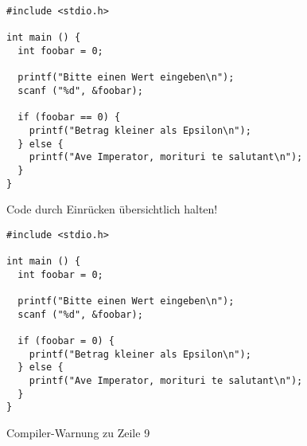 
\begin{frame}[fragile]
%
\begin{codebox}
\begin{verbatim}
#include <stdio.h>

int main () {
  int foobar = 0;
  
  printf("Bitte einen Wert eingeben\n");
  scanf ("%d", &foobar);
  
  if (foobar == 0) {
    printf("Betrag kleiner als Epsilon\n");
  } else {
    printf("Ave Imperator, morituri te salutant\n");
  }
}
\end{verbatim}
\end{codebox}
%
\begin{hintbox}
\small Code durch Einrücken übersichtlich halten!
\end{hintbox}
%
\end{frame}


\begin{frame}[fragile]
%
\begin{codebox}
\begin{verbatim}
#include <stdio.h>

int main () {
  int foobar = 0;
  
  printf("Bitte einen Wert eingeben\n");
  scanf ("%d", &foobar);
  
  if (foobar = 0) {
    printf("Betrag kleiner als Epsilon\n");
  } else {
    printf("Ave Imperator, morituri te salutant\n");
  }
}
\end{verbatim}
\end{codebox}
%
\begin{warnbox}
\small Compiler-Warnung zu Zeile 9
\end{warnbox}
%
\end{frame}


